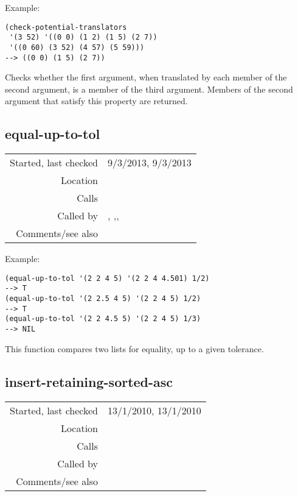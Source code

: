 \vspace{0.5cm}
\noindent Example:
\begin{verbatim}
(check-potential-translators
 '(3 52) '((0 0) (1 2) (1 5) (2 7))
 '((0 60) (3 52) (4 57) (5 59)))
--> ((0 0) (1 5) (2 7))
\end{verbatim}

\noindent Checks whether the first argument, when
translated by each member of the second argument, is a
member of the third argument. Members of the second
argument that satisfy this property are returned.


\subsection*{equal-up-to-tol}\label{fun:equal-up-to-tol}

\vspace{0.3cm}
\begin{tabular}{r|p{8cm}}
Started, last checked & 9/3/2013, 9/3/2013 \\
Location & \nameref{sec:set-operations} \\
Calls & \\
Called by & \nameref{fun:cardinality-score}, \nameref{fun:equalp-score},\newline \nameref{fun:frequency-count},\newline \nameref{fun:most-frequent-difference-vector} \\
Comments/see also & 
\end{tabular}

\vspace{0.5cm}
\noindent Example:
\begin{verbatim}
(equal-up-to-tol '(2 2 4 5) '(2 2 4 4.501) 1/2)
--> T
(equal-up-to-tol '(2 2.5 4 5) '(2 2 4 5) 1/2)
--> T
(equal-up-to-tol '(2 2 4.5 5) '(2 2 4 5) 1/3)
--> NIL
\end{verbatim}

\noindent This function compares two lists for
equality, up to a given tolerance.


\subsection*{insert-retaining-sorted-asc}\label{fun:insert-retaining-sorted-asc}

\vspace{0.3cm}
\begin{tabular}{r|p{8cm}}
Started, last checked & 13/1/2010, 13/1/2010 \\
Location & \nameref{sec:set-operations} \\
Calls & \nameref{fun:vector<vector} \\
Called by & \nameref{fun:union-multidimensional-sorted-asc} \\
Comments/see also & 
\end{tabular}

